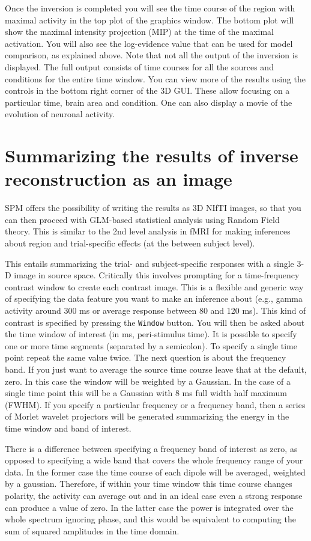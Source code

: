 Once the inversion is completed you will see the time course of the region with maximal activity in the top plot of the graphics window. The bottom plot will show the maximal intensity projection (MIP) at the time of the maximal activation. You will also see the log-evidence value that can be used for model comparison, as explained above. Note that not all the output of the inversion is displayed. The full output consists of time courses for all the sources and conditions for the entire time window. You can view more of the results using the controls in the bottom right corner of the 3D GUI. These allow focusing on a particular time, brain area and condition. One can also display a movie of the evolution of neuronal activity.

\section{Summarizing the results of inverse reconstruction as an image}
SPM offers the possibility of writing the results as 3D NIfTI images, so that you can then proceed with GLM-based statistical analysis using Random Field theory. This is similar to the 2nd level analysis in fMRI for making inferences about region and trial-specific effects (at the between subject level).

This entails summarizing the trial- and subject-specific responses with a single 3-D image in source space. Critically this involves prompting for a time-frequency contrast window to create each contrast image. This is a flexible and generic way of specifying the data feature you want to make an inference about (e.g., gamma activity around 300 ms or average response between 80 and 120 ms). This kind of contrast is specified by pressing the \texttt{Window} button. You will then be asked about the time window of interest (in ms, peri-stimulus time). It is possible to specify one or more time segments (separated by a semicolon). To specify a single time point repeat the same value twice. The next question is about the frequency band. If you just want to average the source time course leave that at the default, zero. In this case the window will be weighted by a Gaussian. In the case of a single time point this will be a Gaussian with 8 ms full width half maximum (FWHM). If you specify a particular frequency or a frequency band, then a series of Morlet wavelet projectors will be generated summarizing the energy in the time window and band of interest.

There is a difference between specifying a frequency band of interest as zero, as opposed to specifying a wide band that covers the whole frequency range of your data. In the former case the time course of each dipole will be averaged, weighted by a gaussian. Therefore, if within your time window this time course changes polarity, the activity can average out and in an ideal case even a strong response can produce a value of zero. In the latter case the power is integrated over the whole spectrum ignoring phase, and this would be equivalent to computing the sum of squared amplitudes in the time domain.


